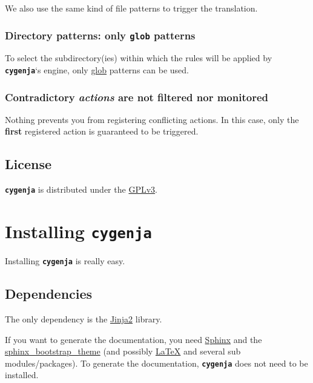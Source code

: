 \documentclass[letterpaper,10pt,english]{sphinxmanual}
\begin{document}
We also use the same kind of file patterns to trigger the translation.


\subsection{Directory patterns: only \textbf{\texttt{glob}} patterns}
\label{introduction:directory-patterns-only-glob-patterns}
To select the subdirectory(ies) within which the rules will be applied by \textbf{\texttt{cygenja}}`s engine, only  \href{https://docs.python.org/2/library/glob.html}{glob} patterns can be used.


\subsection{Contradictory \emph{actions} are not filtered nor monitored}
\label{introduction:contradictory-actions-are-not-filtered-nor-monitored}
Nothing prevents you from registering conflicting actions. In this case, only the \textbf{first} registered action is guaranteed to be triggered.


\section{License}
\label{introduction:license}
\textbf{\texttt{cygenja}} is distributed under the \href{http://www.gnu.org/licenses/gpl-3.0.en.html}{GPLv3}.


\chapter{Installing \textbf{\texttt{cygenja}}}
\label{installation:cygenja-installation}\label{installation:installing-cygenja}\label{installation::doc}
Installing \textbf{\texttt{cygenja}} is really easy.


\section{Dependencies}
\label{installation:dependencies}
The only dependency is the \href{http://jinja.pocoo.org/}{Jinja2} library.

If you want to generate the documentation, you need \href{http://sphinx-doc.org/}{Sphinx} and the \href{https://ryan-roemer.github.io/sphinx-bootstrap-theme/README.html}{sphinx\_bootstrap\_theme} (and possibly \href{https://www.latex-project.org/}{LaTeX} and
several sub modules/packages). To generate the documentation, \textbf{\texttt{cygenja}} does not need to be installed.
\end{document}
